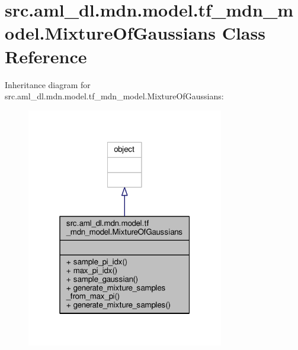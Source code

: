 \hypertarget{classsrc_1_1aml__dl_1_1mdn_1_1model_1_1tf__mdn__model_1_1_mixture_of_gaussians}{\section{src.\-aml\-\_\-dl.\-mdn.\-model.\-tf\-\_\-mdn\-\_\-model.\-Mixture\-Of\-Gaussians Class Reference}
\label{classsrc_1_1aml__dl_1_1mdn_1_1model_1_1tf__mdn__model_1_1_mixture_of_gaussians}
}


Inheritance diagram for src.\-aml\-\_\-dl.\-mdn.\-model.\-tf\-\_\-mdn\-\_\-model.\-Mixture\-Of\-Gaussians\-:\nopagebreak
\begin{figure}[H]
\begin{center}
\leavevmode
\includegraphics[width=244pt]{classsrc_1_1aml__dl_1_1mdn_1_1model_1_1tf__mdn__model_1_1_mixture_of_gaussians__inherit__graph}
\end{center}
\end{figure}


